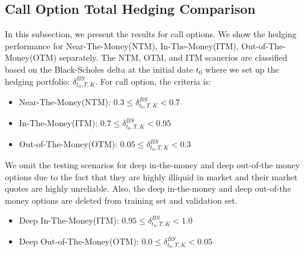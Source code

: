 \documentclass[letterpaper,12pt,titlepage,oneside,final]{book}
\numberwithin{equation}{section}
\theoremstyle{definition}
\begin{document}
\subsection{Call Option Total Hedging Comparison}
In this subsection, we present the results for call options. We show the hedging performance for Near-The-Money(NTM), In-The-Money(ITM), Out-of-The-Money(OTM) separately.  The NTM, OTM, and ITM scanerios are classified based on the Black-Scholes delta at the initial date $t_0$ where we set up the hedging portfolio: $\delta^{BS}_{t_0,T,K}$. For call option, the criteria is:
\begin{itemize}
	\item  Near-The-Money(NTM): $0.3 \leq \delta^{BS}_{t_0,T,K} <0.7$
	\item  In-The-Money(ITM): $0.7 \leq \delta^{BS}_{t_0,T,K} <0.95$
	\item  Out-of-The-Money(OTM):  $0.05 \leq \delta^{BS}_{t_0,T,K} <0.3$
\end{itemize}
We omit the testing scenarios for deep in-the-money and deep out-of-the money options due to the fact that they are highly illiquid in market and their market quotes are highly unreliable. Also, the deep in-the-money and deep out-of-the money options are deleted from training set and validation set.
\begin{itemize}
	\item  Deep In-The-Money(ITM): $0.95 \leq \delta^{BS}_{t_0,T,K} <1.0$
	\item  Deep Out-of-The-Money(OTM):  $0.0 \leq \delta^{BS}_{t_0,T,K} <0.05$
\end{itemize}
\end{document}
